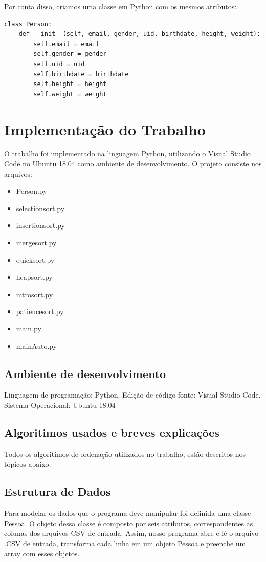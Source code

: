 \documentclass[a4paper,12pt]{scrartcl}
\begin{document}
Por conta disso, criamos uma classe em Python com os mesmos atributos:
\begin{lstlisting}
class Person:
    def __init__(self, email, gender, uid, birthdate, height, weight):
        self.email = email
        self.gender = gender
        self.uid = uid
        self.birthdate = birthdate
        self.height = height
        self.weight = weight
\end{lstlisting}


\section{Implementação do Trabalho}

O trabalho foi implementado na linguagem Python, utilizando o Visual Studio Code no Ubuntu 18.04 como ambiente de desenvolvimento. O projeto consiste nos arquivos:

\begin{itemize}
	\item Person.py 
	\item selectionsort.py
	\item insertionsort.py 
	\item mergesort.py 
	\item quicksort.py
	\item heapsort.py
	\item introsort.py
	\item patiencesort.py
	\item main.py 
	\item mainAuto.py
\end{itemize}


\subsection{Ambiente de desenvolvimento}
\label{sec:implementacao}

Linguagem de programação: Python. \newline
Edição de código fonte: Visual Studio Code. \newline
Sistema Operacional: Ubuntu 18.04

\subsection{Algoritimos usados e breves explicações}
Todos os algoritimos de ordenação utilizados no trabalho, estão descritos nos tópicos abaixo.


\subsection{Estrutura de Dados}
Para modelar os dados que o programa deve manipular foi definida uma classe Pessoa. O objeto dessa classe é composto por seis atributos, correspondentes as colunas dos arquivos CSV de entrada. Assim, nosso programa abre e lê o arquivo .CSV de entrada, transforma cada linha em um objeto Pessoa e preenche um array com esses objetos.
\end{document}
